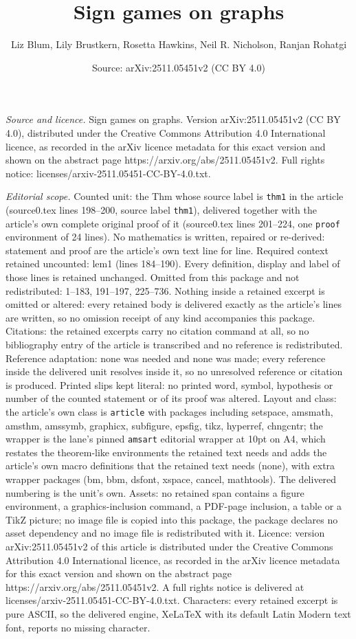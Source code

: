 \documentclass[10pt,a4paper]{amsart}
\title[Sign games on graphs]{Sign games on graphs}
\author{Liz Blum, Lily Brustkern, Rosetta Hawkins, Neil R. Nicholson, Ranjan Rohatgi}
\date{Source: arXiv:2511.05451v2 (CC BY 4.0)}
\begin{document}
\maketitle

\noindent\emph{Source and licence.} Sign games on graphs. Version arXiv:2511.05451v2 (CC BY 4.0), distributed under the Creative Commons Attribution 4.0 International licence, as recorded in the arXiv licence metadata for this exact version and shown on the abstract page https://arxiv.org/abs/2511.05451v2. Full rights notice: licenses/arxiv-2511.05451-CC-BY-4.0.txt.\par\smallskip

\noindent\textit{Editorial scope.} Counted unit: the Thm whose source label is \texttt{thm1} in the article (source0.tex lines 198--200, source label \texttt{thm1}), delivered together with the article's own complete original proof of it (source0.tex lines 201--224, one \texttt{proof} environment of 24 lines). No mathematics is written, repaired or re-derived: statement and proof are the article's own text line for line. Required context retained uncounted: lem1 (lines 184--190). Every definition, display and label of those lines is retained unchanged. Omitted from this package and not redistributed: 1--183, 191--197, 225--736. Nothing inside a retained excerpt is omitted or altered: every retained body is delivered exactly as the article's lines are written, so no omission receipt of any kind accompanies this package. Citations: the retained excerpts carry no citation command at all, so no bibliography entry of the article is transcribed and no reference is redistributed. Reference adaptation: none was needed and none was made; every reference inside the delivered unit resolves inside it, so no unresolved reference or citation is produced. Printed slips kept literal: no printed word, symbol, hypothesis or number of the counted statement or of its proof was altered. Layout and class: the article's own class is \texttt{article} with packages including setspace, amsmath, amsthm, amssymb, graphicx, subfigure, epsfig, tikz, hyperref, chngcntr; the wrapper is the lane's pinned \texttt{amsart} editorial wrapper at 10pt on A4, which restates the theorem-like environments the retained text needs and adds the article's own macro definitions that the retained text needs (none), with extra wrapper packages (bm, bbm, dsfont, xspace, cancel, mathtools). The delivered numbering is the unit's own. Assets: no retained span contains a figure environment, a graphics-inclusion command, a PDF-page inclusion, a table or a TikZ picture; no image file is copied into this package, the package declares no asset dependency and no image file is redistributed with it. Licence: version arXiv:2511.05451v2 of this article is distributed under the Creative Commons Attribution 4.0 International licence, as recorded in the arXiv licence metadata for this exact version and shown on the abstract page https://arxiv.org/abs/2511.05451v2. A full rights notice is delivered at licenses/arxiv-2511.05451-CC-BY-4.0.txt. Characters: every retained excerpt is pure ASCII, so the delivered engine, XeLaTeX with its default Latin Modern text font, reports no missing character.
\end{document}
